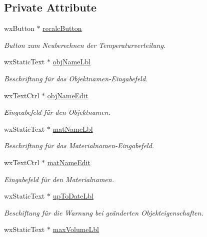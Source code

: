 \subsection*{Private Attribute}
\begin{DoxyCompactItemize}
\item 
wx\-Button $\ast$ \hyperlink{classPropertiesBox_a0f5356371cde511efeb413bc2a98e6fc}{recalc\-Button}
\begin{DoxyCompactList}\small\item\em Button zum Neuberechnen der Temperaturverteilung. \end{DoxyCompactList}\item 
wx\-Static\-Text $\ast$ \hyperlink{classPropertiesBox_ac281563a94d4cdffd51084d88cafc692}{obj\-Name\-Lbl}
\begin{DoxyCompactList}\small\item\em Beschriftung für das Objektnamen-\/\-Eingabefeld. \end{DoxyCompactList}\item 
wx\-Text\-Ctrl $\ast$ \hyperlink{classPropertiesBox_a7bb26289d5da39d7996c794216f4d89b}{obj\-Name\-Edit}
\begin{DoxyCompactList}\small\item\em Eingeabefeld für den Objektnamen. \end{DoxyCompactList}\item 
wx\-Static\-Text $\ast$ \hyperlink{classPropertiesBox_ae07827304c19b4e71532fed5a4c65bb0}{mat\-Name\-Lbl}
\begin{DoxyCompactList}\small\item\em Beschriftung für das Materialnamen-\/\-Eingabefeld. \end{DoxyCompactList}\item 
wx\-Text\-Ctrl $\ast$ \hyperlink{classPropertiesBox_aba989cc01ddce5251f021419bfe3408f}{mat\-Name\-Edit}
\begin{DoxyCompactList}\small\item\em Eingabefeld für den Materialnamen. \end{DoxyCompactList}\item 
wx\-Static\-Text $\ast$ \hyperlink{classPropertiesBox_acd0a5ccaa4e981b961685c5714e67f92}{up\-To\-Date\-Lbl}
\begin{DoxyCompactList}\small\item\em Beschiftung für die Warnung bei geänderten Objekteigenschaften. \end{DoxyCompactList}\item 
wx\-Static\-Text $\ast$ \hyperlink{classPropertiesBox_ac37df12581fc6f63aa87b2807d62fdb5}{max\-Volume\-Lbl}

\end{DoxyCompactItemize}
